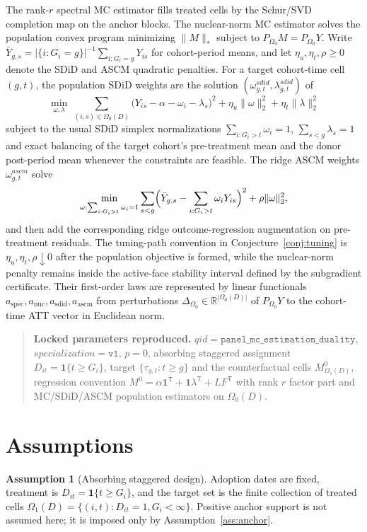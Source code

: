 \documentclass[11pt]{article}
\newcommand{\one}{\mathbf{1}}
\newcommand{\transpose}{\mathsf{T}}
\newcommand{\R}{\mathbb{R}}
\theoremstyle{definition}
\newtheorem{assumption}{Assumption}
\theoremstyle{plain}
\theoremstyle{remark}
\begin{document}
The rank-$r$ spectral MC estimator fills treated cells by the Schur/SVD
completion map on the anchor blocks. The nuclear-norm MC estimator solves the
population convex program minimizing $\|M\|_*$ subject to
$P_{\Omega_0}M=P_{\Omega_0}Y$. Write
$\bar Y_{g,s}=|\{i:G_i=g\}|^{-1}\sum_{i:G_i=g}Y_{is}$ for cohort-period
means, and let $\eta_u,\eta_t,\rho\ge0$ denote the SDiD and ASCM quadratic
penalties. For a target cohort-time cell $(g,t)$, the population SDiD weights
are the solution
$(\omega^{sdid}_{g,t},\lambda^{sdid}_{g,t})$ of
\[
\min_{\omega,\lambda}\ 
\sum_{(i,s)\in\Omega_0(D)}\!
\bigl(Y_{is}-\alpha-\omega_i-\lambda_s\bigr)^2+
\eta_u\|\omega\|_2^2+\eta_t\|\lambda\|_2^2
\]
subject to the usual SDiD simplex normalizations
$\sum_{i:G_i>t}\omega_i=1$, $\sum_{s<g}\lambda_s=1$ and exact balancing of
the target cohort's pre-treatment mean and the donor post-period mean whenever
the constraints are feasible. The ridge ASCM weights
$\omega^{ascm}_{g,t}$ solve
\[
\min_{\omega:\sum_{i:G_i>t}\omega_i=1}
\sum_{s<g}\Bigl(\bar Y_{g,s}-\sum_{i:G_i>t}\omega_iY_{is}\Bigr)^2+
\rho\|\omega\|_2^2,
\]
and then add the corresponding ridge outcome-regression augmentation on
pre-treatment residuals. The tuning-path convention in
Conjecture~\ref{conj:tuning} is $\eta_u,\eta_t,\rho\downarrow0$ after the
population objective is formed, while the nuclear-norm penalty remains inside
the active-face stability interval defined by the subgradient certificate.
Their first-order laws are represented by linear functionals
$a_{\mathrm{spec}},a_{\mathrm{nuc}},a_{\mathrm{sdid}},a_{\mathrm{ascm}}$ from
perturbations $\Delta_{\Omega_0}\in\R^{|\Omega_0(D)|}$ of
$P_{\Omega_0}Y$ to the cohort-time ATT vector in Euclidean norm.

\begin{quote}
\textbf{Locked parameters reproduced.}
$qid=\texttt{panel\_mc\_estimation\_duality}$,
$specialization=\texttt{v1}$, $p=0$, absorbing staggered assignment
$D_{it}=\one\{t\ge G_i\}$, target $\{\tau_{g,t}:t\ge g\}$ and the
counterfactual cells $M^0_{\Omega_1(D)}$, regression convention
$M^0=\alpha\one^\transpose+\one\lambda^\transpose+L F^\transpose$ with rank
$r$ factor part and MC/SDiD/ASCM population estimators on $\Omega_0(D)$.
\end{quote}

\section{Assumptions}
\begin{assumption}[Absorbing staggered design]\label{ass:staggered}
Adoption dates are fixed, treatment is $D_{it}=\one\{t\ge G_i\}$, and the
target set is the finite collection of treated cells
$\Omega_1(D)=\{(i,t):D_{it}=1,G_i<\infty\}$. Positive anchor support is not
assumed here; it is imposed only by Assumption~\ref{ass:anchor}.
\end{assumption}
\end{document}
